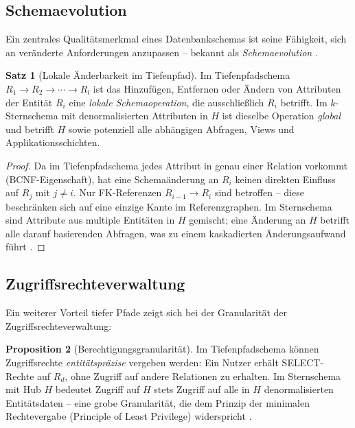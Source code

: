 ﻿\documentclass[12pt,a4paper]{article}
\theoremstyle{definition}
\newtheorem{theorem}{Satz}[section]
\newtheorem{proposition}[theorem]{Proposition}
\theoremstyle{remark}
\begin{document}
\subsection{Schemaevolution}

Ein zentrales Qualitätsmerkmal eines Datenbankschemas ist seine
Fähigkeit, sich an veränderte Anforderungen anzupassen -- bekannt als
\emph{Schemaevolution} \cite{Roddick1995}.

\begin{theorem}[Lokale Änderbarkeit im Tiefenpfad]
\label{thm:schaemaevolution}
Im Tiefenpfadschema $R_1 \to R_2 \to \cdots \to R_l$ ist das Hinzufügen,
Entfernen oder Ändern von Attributen der Entität $R_i$ eine
\emph{lokale Schemaoperation}, die ausschließlich $R_i$ betrifft.
Im $k$-Sternschema mit denormalisierten Attributen in $H$ ist dieselbe
Operation \emph{global} und betrifft $H$ sowie potenziell alle
abhängigen Abfragen, Views und Applikationsschichten.
\end{theorem}

\begin{proof}
Da im Tiefenpfadschema jedes Attribut in genau einer Relation vorkommt
(BCNF-Eigenschaft), hat eine Schemaänderung an $R_i$ keinen direkten
Einfluss auf $R_j$ mit $j \neq i$. Nur FK-Referenzen
$R_{i-1} \to R_i$ sind betroffen -- diese beschränken sich auf eine
einzige Kante im Referenzgraphen. Im Sternschema sind Attribute aus
multiple Entitäten in $H$ gemischt; eine Änderung an $H$ betrifft
alle darauf basierenden Abfragen, was zu einem kaskadierten
Änderungsaufwand führt \cite{Ambler2003}.
\end{proof}

\subsection{Zugriffsrechteverwaltung}

Ein weiterer Vorteil tiefer Pfade zeigt sich bei der Granularität der
Zugriffsrechteverwaltung:

\begin{proposition}[Berechtigungsgranularität]
Im Tiefenpfadschema können Zugriffsrechte \emph{entitätspräzise} vergeben
werden: Ein Nutzer erhält SELECT-Rechte auf $R_d$, ohne Zugriff auf andere
Relationen zu erhalten. Im Sternschema mit Hub $H$ bedeutet Zugriff auf
$H$ stets Zugriff auf alle in $H$ denormalisierten Entitätsdaten --
eine grobe Granularität, die dem Prinzip der minimalen Rechtevergabe
(Principle of Least Privilege) widerspricht \cite{Saltzer1975}.
\end{proposition}
\end{document}
